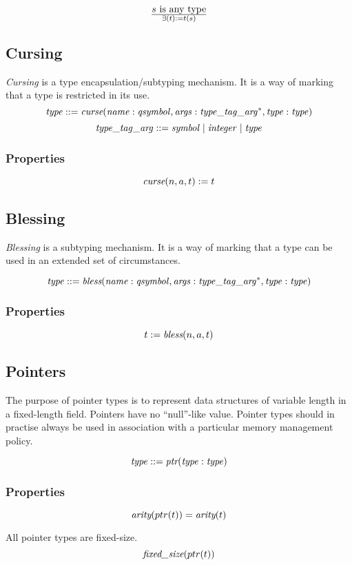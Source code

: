 \documentclass[a4paper]{report}
\newcommand\arity{{\ensuremath\textit{arity}}}
\newcommand\fixedsize{{\ensuremath\textit{fixed\_size}}}
\newcommand\tyBless{{\ensuremath\textit{bless}}}
\newcommand\tyCurse{{\ensuremath\textit{curse}}}
\newcommand\tyPtr{{\ensuremath\textit{ptr}}}
\begin{document}
$${s \textrm{ is any type}} \over \exists(t) := t(s)$$


\subsection{Cursing}
\emph{Cursing} is a type encapsulation/subtyping mechanism.
It is a way of marking that a type is restricted in its use.
$$
\it type ::= \tyCurse(name : qsymbol, args : type\_tag\_arg^*, type : type)
$$
$$
\it type\_tag\_arg ::= symbol \;|\; integer \;|\; type
$$

\subsubsection*{Properties}
$$
\tyCurse(n,a,t) := t
$$

\subsection{Blessing}
\emph{Blessing} is a subtyping mechanism.
It is a way of marking that a type can be used in an extended set of
circumstances.

$$
\it type ::= \tyBless(name : qsymbol, args : type\_tag\_arg^*, type : type)
$$

\subsubsection*{Properties}
$$
t := \tyBless(n,a,t)
$$

\subsection{Pointers}
The purpose of pointer types is to represent data structures of variable length
in a fixed-length field.
Pointers have no ``null''-like value. Pointer types should in practise
always be used in association with a particular memory management
policy.

$$\it type ::= \tyPtr(type : type)$$

\subsubsection*{Properties}
$$ \arity(ptr(t)) = \arity(t)$$

All pointer types are fixed-size.
$$\fixedsize(ptr(t))$$
\end{document}
